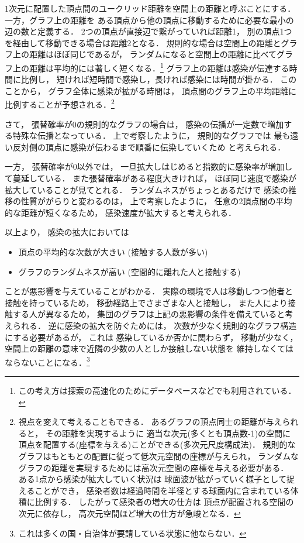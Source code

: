 \documentclass[10pt,oneside]{scrartcl}
\begin{document}
1次元に配置した頂点間のユークリッド距離を空間上の距離と呼ぶことにする．
一方，グラフ上の距離を
ある頂点から他の頂点に移動するために必要な最小の辺の数と定義する．
2つの頂点が直接辺で繋がっていれば距離1，
別の頂点1つを経由して移動できる場合は距離2となる．
規則的な場合は空間上の距離とグラフ上の距離はほぼ同じであるが，
ランダムになると空間上の距離に比べてグラフ上の距離は平均的には著しく短くなる．\footnote{この考え方は探索の高速化のためにデータベースなどでも利用されている．}
グラフ上の距離は感染が伝達する時間に比例し，
短ければ短時間で感染し，長ければ感染には時間が掛かる．
このことから，
グラフ全体に感染が拡がる時間は，
頂点間のグラフ上の平均距離に比例することが予想される．\footnote{視点を変えて考えることもできる．
あるグラフの頂点同士の距離が与えられると，
その距離を実現するように
適当な次元(多くとも頂点数-1)の空間に
頂点を配置する(座標を与える)ことができる(多次元尺度構成法)．
規則的なグラフはもともとの配置に従って低次元空間の座標が与えられ，
ランダムなグラフの距離を実現するためには高次元空間の座標を与える必要がある．
ある1点から感染が拡大していく状況は
球面波が拡がっていく様子として捉えることができ，
感染者数は経過時間を半径とする球面内に含まれている体積に比例する．
したがって感染者の増大の仕方は
頂点が配置される空間の次元に依存し，
高次元空間ほど増大の仕方が急峻となる．}

さて，
張替確率が0の規則的なグラフの場合は，
感染の伝播が一定数で増加する特殊な伝播となっている．
上で考察したように，
規則的なグラフでは
最も遠い反対側の頂点に感染が伝わるまで順番に伝染していくため
と考えられる．

一方，
張替確率が0以外では，
一旦拡大しはじめると指数的に感染率が増加して蔓延している．
また張替確率がある程度大きければ，
ほぼ同じ速度で感染が拡大していることが見てとれる．
ランダムネスがちょっとあるだけで
感染の推移の性質ががらりと変わるのは，
上で考察したように，
任意の2頂点間の平均的な距離が短くなるため，
感染速度が拡大すると考えられる．

\begin{figure*}%
  \centering
\end{figure*}

以上より，
感染の拡大においては
\begin{itemize}
\item 頂点の平均的な次数が大きい (接触する人数が多い)
\item グラフのランダムネスが高い (空間的に離れた人と接触する)
\end{itemize}
ことが悪影響を与えていることがわかる．
実際の環境で人は移動しつつ他者と接触を持っているため，
移動経路上でさまざまな人と接触し，
また人により接触する人が異なるため，
集団のグラフは上記の悪影響の条件を備えていると考えられる．
逆に感染の拡大を防ぐためには，
次数が少なく規則的なグラフ構造にする必要があるが，
これは
感染しているか否かに関わらず，
移動が少なく，
空間上の距離の意味で近隣の少数の人としか接触しない状態を
維持しなくてはならないことになる．\footnote{これは多くの国・自治体が要請している状態に他ならない．}
\end{document}
